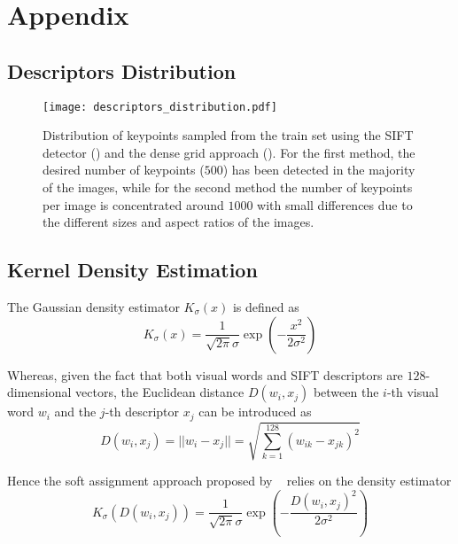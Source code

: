 \documentclass[../main.tex]{subfiles}
\begin{document}
\section{Appendix}\label{appendix}

\subsection{Descriptors Distribution}\label{app:keypoints-distribution}

\begin{figure}[htb]
  \centering
  \texttt{[image: descriptors\_distribution.pdf]}
  \caption{Distribution of keypoints sampled from the train set using the SIFT
  detector () and the dense grid approach (). For the first
  method, the desired number of keypoints ($500$) has been detected in the
  majority of the images, while for the second method the number of keypoints
  per image is concentrated around $1000$ with small differences due to the
  different sizes and aspect ratios of the images.}\label{fig:keypoints-distribution}
\end{figure}

\subsection{Kernel Density Estimation}\label{app:kernel-density-estimation}

The Gaussian density estimator $K_{\sigma}(x)$ is defined as
\begin{equation}
  K_{\sigma}(x) = \frac{1}{\sqrt{2\pi}\sigma} \exp\left(-\frac{x^2}{2\sigma^2}\right)
\end{equation}

Whereas, given the fact that both visual words and SIFT descriptors are
$128$-dimensional vectors, the Euclidean distance $D(w_i, x_j)$ between the $i$-th visual word $w_i$ and the $j$-th descriptor $x_j$ can be introduced as
\begin{equation}
  D(w_i, x_j) = ||w_i - x_j|| = \sqrt{\sum_{k=1}^{128} (w_{ik} - x_{jk})^2}
\end{equation}

Hence the soft assignment approach proposed by ~\cite{gemert} relies on the density estimator
\begin{equation}
  K_{\sigma}(D(w_i, x_j)) = \frac{1}{\sqrt{2\pi}\sigma} \exp\left(-\frac{D(w_i, x_j)^2}{2\sigma^2}\right)
\end{equation}
\end{document}

